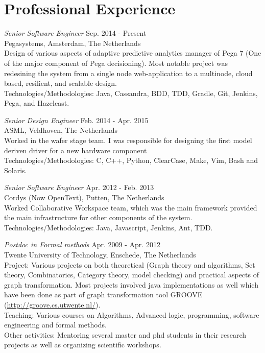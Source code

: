 \section{Professional Experience}

{\sl Senior Software Engineer} \hfill Sep. 2014 - Present \\
Pegasystems, Amsterdam, The Netherlands \\
Design of various aspects of adaptive predictive analytics manager of Pega 7 (One of the major component of Pega decisioning). Most notable project was redesining the system from a single node web-application to a multinode, cloud based, resilient, and scalable design. \\
Technologies/Methodologies: Java, Cassandra, BDD, TDD, Gradle, Git, Jenkins, Pega, and Hazelcast.

{\sl Senior Design Engineer}  \hfill Feb. 2014 - Apr. 2015 \\
ASML, Veldhoven, The Netherlands \\
Worked in the wafer stage team. I was responsible for designing the first model deriven driver for a new hardware component \\
Technologies/Methodologies: C, C++, Python, ClearCase, Make, Vim, Bash and Solaris.

{\sl Senior Software Engineer}  \hfill Apr. 2012 - Feb. 2013 \\
Cordys (Now OpenText), Putten, The Netherlands \\
Worked Collaborative Workspace team, which was the main framework provided the main infrastructure for other components of the system. \\
Technologies/Methodologies: Java, Javascript, Jenkins, Ant, TDD.

{\sl Postdoc in Formal methods}  \hfill Apr. 2009 - Apr. 2012 \\
Twente University of Technology, Enschede, The Netherlands  \\
\ifindustry
Project: Various projects on both theoretical (Graph theory and algorithms, Set theory, Combinatorics, Category theory, model checking) and practical aspects of graph transformation. 
Most projects involved java implementations as well which have been done as part of graph transformation tool GROOVE (\url{http://groove.cs.utwente.nl/}).  \\
Teaching: Various courses on Algorithms, Advanced logic, programming, software engineering and formal methods. \\
Other activities: Mentoring several master and phd students in their research projects as well as organizing scientific workshops.
\fi

